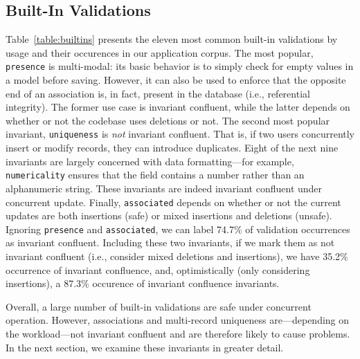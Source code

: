 \subsection{Built-In Validations}

Table~\ref{table:builtins} presents the eleven most common built-in
validations by usage and their occurences in our application
corpus. The most popular, \texttt{presence} is multi-modal: its basic
behavior is to simply check for empty values in a model before
saving. However, it can also be used to enforce that the opposite end
of an association is, in fact, present in the database (i.e.,
referential integrity). The former use case is invariant confluent,
while the latter depends on whether or not the codebase uses deletions
or not. The second most popular invariant, \texttt{uniqueness} is
\textit{not} invariant confluent. That is, if two users concurrently
insert or modify records, they can introduce duplicates. Eight of the
next nine invariants are largely concerned with data formatting---for
example, \texttt{numericality} ensures that the field contains a
number rather than an alphanumeric string. These invariants are indeed
invariant confluent under concurrent update. Finally,
\texttt{associated} depends on whether or not the current updates are
both insertions (safe) or mixed insertions and deletions
(unsafe). Ignoring \texttt{presence} and \texttt{associated}, we can
label 74.7\% of validation occurrences as invariant
confluent. Including these two invariants, if we mark them as not
invariant confluent (i.e., consider mixed deletions and insertions),
we have 35.2\% occurrence of invariant confluence, and, optimistically
(only considering insertions), a 87.3\% occurence of invariant
confluence invariants.

Overall, a large number of built-in validations are safe under
concurrent operation. However, associations and multi-record
uniqueness are---depending on the workload---not invariant confluent
and are therefore likely to cause problems. In the next section, we
examine these invariants in greater detail.

